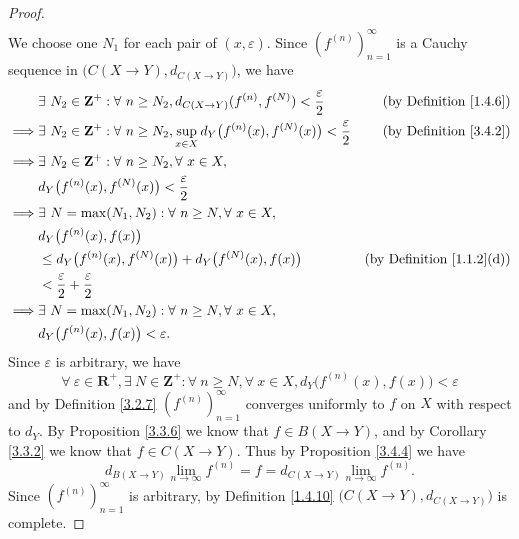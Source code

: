 \begin{proof}
\begin{align*}
    \end{align*}
    We choose one \(N_1\) for each pair of \((x, \varepsilon)\).
    Since \((f^{(n)})_{n = 1}^\infty\) is a Cauchy sequence in \(\big(C(X \to Y), d_{C(X \to Y)}\big)\), we have
    \begin{align*}
                 & \exists\ N_2 \in \mathbf{Z}^+ : \forall\ n \geq N_2, d_{C(X \to Y)}(f^{(n)}, f^{(N)}) < \frac{\varepsilon}{2}                   & \text{(by Definition \ref{1.4.6})}    \\
        \implies & \exists\ N_2 \in \mathbf{Z}^+ : \forall\ n \geq N_2, \sup_{x \in X} d_Y\big(f^{(n)}(x), f^{(N)}(x)\big) < \frac{\varepsilon}{2} & \text{(by Definition \ref{3.4.2})}    \\
        \implies & \exists\ N_2 \in \mathbf{Z}^+ : \forall\ n \geq N_2, \forall\ x \in X,                                                                                                  \\
                 & d_Y\big(f^{(n)}(x), f^{(N)}(x)\big) < \frac{\varepsilon}{2}                                                                                                             \\
        \implies & \exists\ N = \max(N_1, N_2) : \forall\ n \geq N, \forall\ x \in X,                                                                                                      \\
                 & d_Y\big(f^{(n)}(x), f(x)\big)                                                                                                                                           \\
                 & \leq d_Y\big(f^{(n)}(x), f^{(N)}(x)\big) + d_Y\big(f^{(N)}(x), f(x)\big)                                                        & \text{(by Definition \ref{1.1.2}(d))} \\
                 & < \frac{\varepsilon}{2} + \frac{\varepsilon}{2}                                                                                                                         \\
        \implies & \exists\ N = \max(N_1, N_2) : \forall\ n \geq N, \forall\ x \in X,                                                                                                      \\
                 & d_Y\big(f^{(n)}(x), f(x)\big) < \varepsilon.
    \end{align*}
    Since \(\varepsilon\) is arbitrary, we have
    \[
        \forall\ \varepsilon \in \mathbf{R}^+, \exists\ N \in \mathbf{Z}^+ : \forall\ n \geq N, \forall\ x \in X, d_Y\big(f^{(n)}(x), f(x)\big) < \varepsilon
    \]
    and by Definition \ref{3.2.7} \((f^{(n)})_{n = 1}^\infty\) converges uniformly to \(f\) on \(X\) with respect to \(d_Y\).
    By Proposition \ref{3.3.6} we know that \(f \in B(X \to Y)\), and by Corollary \ref{3.3.2} we know that \(f \in C(X \to Y)\).
    Thus by Proposition \ref{3.4.4} we have
    \[
        d_{B(X \to Y)} \lim_{n \to \infty} f^{(n)} = f = d_{C(X \to Y)} \lim_{n \to \infty} f^{(n)}.
    \]
    Since \((f^{(n)})_{n = 1}^\infty\) is arbitrary, by Definition \ref{1.4.10} \(\big(C(X \to Y), d_{C(X \to Y)}\big)\) is complete.
\end{proof}

